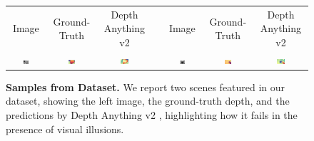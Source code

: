 \begin{figure}[t]
    \centering
    \renewcommand{\tabcolsep}{1pt}
    \hspace*{-0.5cm}\begin{tabular}{ccccccc}
    \small Image
    & \small Ground-Truth
    & \small Depth Anything v2 \cite{depth_anything_v2} & 
    & \small Image
    & \small Ground-Truth
    & \small Depth Anything v2 \cite{depth_anything_v2} \\
    
    \includegraphics[width=0.16\textwidth]{imgs/monotrap_samples/rgb/13.jpg}
    &\includegraphics[width=0.16\textwidth]{imgs/monotrap_samples/gt/13.jpg}
    &\includegraphics[width=0.16\textwidth]{imgs/monotrap_samples/mono/13.jpg}
    & \hspace{0.1cm} &

    \includegraphics[width=0.16\textwidth]{imgs/monotrap_samples/rgb/2.jpg}
    &\includegraphics[width=0.16\textwidth]{imgs/monotrap_samples/gt/2.jpg}
    &\includegraphics[width=0.16\textwidth]{imgs/monotrap_samples/mono/2.jpg}
    \\
    \end{tabular}\vspace{-0.2cm}
    \caption{\textbf{Samples from \dataset Dataset.} We report two scenes featured in our dataset, showing the left image, the ground-truth depth, and the predictions by Depth Anything v2 \cite{depth_anything_v2}, highlighting how it fails in the presence of visual illusions.}\vspace{-0.3cm}
    \label{fig:monotrap}
\end{figure}

